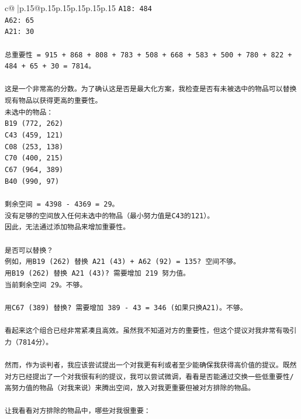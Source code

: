 \documentclass{article}
\begin{document}
{\begin{supertabular}{c@{$\;$}|p{.15\linewidth}@{}p{.15\linewidth}p{.15\linewidth}p{.15\linewidth}p{.15\linewidth}p{.15\linewidth}}
{{{\texttt{A18: 484} \\
\texttt{A62: 65} \\
\texttt{A21: 30} \\
\\ 
\texttt{总重要性 = 915 + 868 + 808 + 783 + 508 + 668 + 583 + 500 + 780 + 822 + 484 + 65 + 30 = 7814。} \\
\\ 
\texttt{这是一个非常高的分数。为了确认这是否是最大化方案，我检查是否有未被选中的物品可以替换现有物品以获得更高的重要性。} \\
\texttt{未选中的物品：} \\
\texttt{B19 (772, 262)} \\
\texttt{C43 (459, 121)} \\
\texttt{C08 (253, 138)} \\
\texttt{C70 (400, 215)} \\
\texttt{C67 (964, 389)} \\
\texttt{B40 (990, 97)} \\
\\ 
\texttt{剩余空间 = 4398 {-} 4369 = 29。} \\
\texttt{没有足够的空间放入任何未选中的物品（最小努力值是C43的121）。} \\
\texttt{因此，无法通过添加物品来增加重要性。} \\
\\ 
\texttt{是否可以替换？} \\
\texttt{例如，用B19 (262) 替换 A21 (43) + A62 (92) = 135? 空间不够。} \\
\texttt{用B19 (262) 替换 A21 (43)? 需要增加 219 努力值。} \\
\texttt{当前剩余空间 29。不够。} \\
\\ 
\texttt{用C67 (389) 替换? 需要增加 389 {-} 43 = 346 (如果只换A21)。不够。} \\
\\ 
\texttt{看起来这个组合已经非常紧凑且高效。虽然我不知道对方的重要性，但这个提议对我非常有吸引力（7814分）。} \\
\\ 
\texttt{然而，作为谈判者，我应该尝试提出一个对我更有利或者至少能确保我获得高价值的提议。既然对方已经提出了一个对我很有利的提议，我可以尝试微调，看看是否能通过交换一些低重要性/高努力值的物品（对我来说）来腾出空间，放入对我更重要但被对方排除的物品。} \\
\\ 
\texttt{让我看看对方排除的物品中，哪些对我很重要：} \\
}}}
\end{supertabular}}
\end{document}
